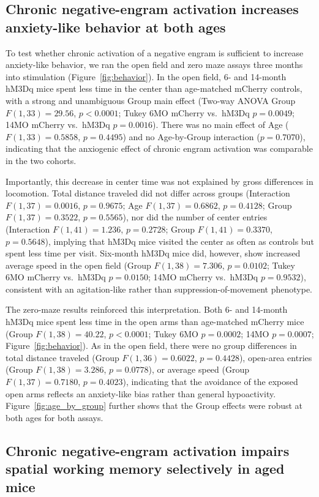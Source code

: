 \documentclass[11pt]{article}
\begin{document}
\subsection{Chronic negative-engram activation increases anxiety-like behavior at both ages}

To test whether chronic activation of a negative engram is sufficient to increase anxiety-like behavior, we ran the open field and zero maze assays three months into stimulation (Figure~\ref{fig:behavior}). In the open field, 6- and 14-month hM3Dq mice spent less time in the center than age-matched mCherry controls, with a strong and unambiguous Group main effect (Two-way ANOVA Group $F(1,33)=29.56$, $p<0.0001$; Tukey 6MO mCherry vs.~hM3Dq $p=0.0049$; 14MO mCherry vs.~hM3Dq $p=0.0016$). There was no main effect of Age ($F(1,33)=0.5858$, $p=0.4495$) and no Age-by-Group interaction ($p=0.7070$), indicating that the anxiogenic effect of chronic engram activation was comparable in the two cohorts.

Importantly, this decrease in center time was not explained by gross differences in locomotion. Total distance traveled did not differ across groups (Interaction $F(1,37)=0.0016$, $p=0.9675$; Age $F(1,37)=0.6862$, $p=0.4128$; Group $F(1,37)=0.3522$, $p=0.5565$), nor did the number of center entries (Interaction $F(1,41)=1.236$, $p=0.2728$; Group $F(1,41)=0.3370$, $p=0.5648$), implying that hM3Dq mice visited the center as often as controls but spent less time per visit. Six-month hM3Dq mice did, however, show increased average speed in the open field (Group $F(1,38)=7.306$, $p=0.0102$; Tukey 6MO mCherry vs.~hM3Dq $p=0.0150$; 14MO mCherry vs.~hM3Dq $p=0.9532$), consistent with an agitation-like rather than suppression-of-movement phenotype.

The zero-maze results reinforced this interpretation. Both 6- and 14-month hM3Dq mice spent less time in the open arms than age-matched mCherry mice (Group $F(1,38)=40.22$, $p<0.0001$; Tukey 6MO $p=0.0002$; 14MO $p=0.0007$; Figure~\ref{fig:behavior}). As in the open field, there were no group differences in total distance traveled (Group $F(1,36)=0.6022$, $p=0.4428$), open-area entries (Group $F(1,38)=3.286$, $p=0.0778$), or average speed (Group $F(1,37)=0.7180$, $p=0.4023$), indicating that the avoidance of the exposed open arms reflects an anxiety-like bias rather than general hypoactivity. Figure~\ref{fig:age_by_group} further shows that the Group effects were robust at both ages for both assays.

\subsection{Chronic negative-engram activation impairs spatial working memory selectively in aged mice}
\end{document}
